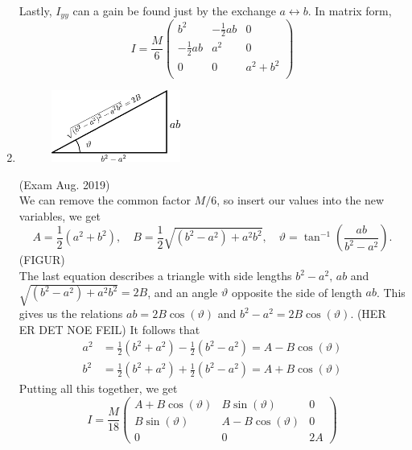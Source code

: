 \documentclass{article}
\begin{document}
\begin{enumerate}[label=(\alph*)]
\begin{align*}
        \end{align*} 
        Lastly, $I_{yy}$ can a gain be found just by the exchange $a \leftrightarrow b$. In matrix form,
        \begin{equation*}
            I = \frac{M}{6}
            \begin{pmatrix*}
                b^2 & -\frac{1}{2} ab & 0 \\
                -\frac{1}{2} ab & a^2 & 0 \\
                0 & 0 & a^2 + b^2 \\
            \end{pmatrix*}
        \end{equation*}
        \item 
        \begin{figure}
            \includegraphics[width=0.4\textwidth]{figures/exercise_1_triangle2.pdf}
        \end{figure}
        (Exam Aug. 2019) \\
        We can remove the common factor $M/6$, so insert our values into the new variables, we get
        \begin{equation*}
            A = \frac{1}{2}(a^2 + b^2), \quad B = \frac{1}{2}\sqrt{(b^2 - a^2) +a^2b^2}, \quad \vartheta = \tan^{-1}\left( \frac{ab}{b^2 - a^2} \right).
        \end{equation*}
        (FIGUR)\\
        The last equation describes a triangle with side lengths $b^2 - a^2, \, ab$ and $\sqrt{(b^2 - a^2) +a^2b^2} = 2B$, and an angle $\vartheta$ opposite the side of length $ab$. This gives us the relations $ab=2 B \cos(\vartheta)$ and $b^2 - a^2 = 2B \cos(\vartheta)$. (HER ER DET NOE FEIL) It follows that
        \begin{align*}
            a^2 &= \frac{1}{2}(b^2 + a^2)  - \frac{1}{2}(b^2 - a^2) = A - B \cos(\vartheta) \\
        b^2 &= \frac{1}{2}(b^2 + a^2)  + \frac{1}{2}(b^2 - a^2) = A + B \cos(\vartheta)
        \end{align*}
        Putting all this together, we get 
        \begin{equation*}
            I = \frac{M}{18}
            \begin{pmatrix*}
                A + B\cos(\vartheta) & B \sin(\vartheta) & 0 \\
                B \sin(\vartheta) & A - B\cos(\vartheta) & 0 \\
                0 & 0 & 2A
            \end{pmatrix*}
        \end{equation*}


\end{enumerate}
\end{document}
